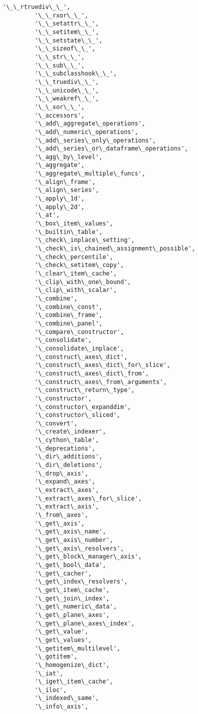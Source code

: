 \documentclass[11pt]{article}
\begin{document}
\begin{Verbatim}[commandchars=\\\{\}]
         '\_\_rtruediv\_\_',
         '\_\_rxor\_\_',
         '\_\_setattr\_\_',
         '\_\_setitem\_\_',
         '\_\_setstate\_\_',
         '\_\_sizeof\_\_',
         '\_\_str\_\_',
         '\_\_sub\_\_',
         '\_\_subclasshook\_\_',
         '\_\_truediv\_\_',
         '\_\_unicode\_\_',
         '\_\_weakref\_\_',
         '\_\_xor\_\_',
         '\_accessors',
         '\_add\_aggregate\_operations',
         '\_add\_numeric\_operations',
         '\_add\_series\_only\_operations',
         '\_add\_series\_or\_dataframe\_operations',
         '\_agg\_by\_level',
         '\_aggregate',
         '\_aggregate\_multiple\_funcs',
         '\_align\_frame',
         '\_align\_series',
         '\_apply\_1d',
         '\_apply\_2d',
         '\_at',
         '\_box\_item\_values',
         '\_builtin\_table',
         '\_check\_inplace\_setting',
         '\_check\_is\_chained\_assignment\_possible',
         '\_check\_percentile',
         '\_check\_setitem\_copy',
         '\_clear\_item\_cache',
         '\_clip\_with\_one\_bound',
         '\_clip\_with\_scalar',
         '\_combine',
         '\_combine\_const',
         '\_combine\_frame',
         '\_combine\_panel',
         '\_compare\_constructor',
         '\_consolidate',
         '\_consolidate\_inplace',
         '\_construct\_axes\_dict',
         '\_construct\_axes\_dict\_for\_slice',
         '\_construct\_axes\_dict\_from',
         '\_construct\_axes\_from\_arguments',
         '\_construct\_return\_type',
         '\_constructor',
         '\_constructor\_expanddim',
         '\_constructor\_sliced',
         '\_convert',
         '\_create\_indexer',
         '\_cython\_table',
         '\_deprecations',
         '\_dir\_additions',
         '\_dir\_deletions',
         '\_drop\_axis',
         '\_expand\_axes',
         '\_extract\_axes',
         '\_extract\_axes\_for\_slice',
         '\_extract\_axis',
         '\_from\_axes',
         '\_get\_axis',
         '\_get\_axis\_name',
         '\_get\_axis\_number',
         '\_get\_axis\_resolvers',
         '\_get\_block\_manager\_axis',
         '\_get\_bool\_data',
         '\_get\_cacher',
         '\_get\_index\_resolvers',
         '\_get\_item\_cache',
         '\_get\_join\_index',
         '\_get\_numeric\_data',
         '\_get\_plane\_axes',
         '\_get\_plane\_axes\_index',
         '\_get\_value',
         '\_get\_values',
         '\_getitem\_multilevel',
         '\_gotitem',
         '\_homogenize\_dict',
         '\_iat',
         '\_iget\_item\_cache',
         '\_iloc',
         '\_indexed\_same',
         '\_info\_axis',

\end{Verbatim}
\end{document}

